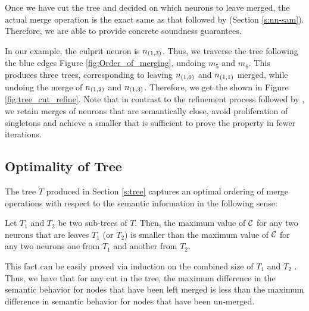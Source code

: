 Once we have cut the tree and decided on which neurons to leave merged, the
actual merge operation is the exact same as that followed by \cite{cegar-nn}
(Section \ref{s:nn-sam}). Therefore, we are able to provide concrete soundness
guarantees.

In our example, the culprit neuron is $n_{(1,3)}$. Thus, we traverse the tree
following the blue edges Figure \ref{fig:Order_of_merging}, undoing $m_5$ and
$m_6$. This produces three trees, corresponding to leaving $n_{(1,0)}$ and
$n_{(1,1)}$ merged, while undoing the merge of $n_{(1,2)}$ and $n_{(1,3)}$.
Therefore, we get the \abs shown in Figure \ref{fig:tree_cut_refine}. Note
that in contrast to the refinement process followed by \cite{cegar-nn} , we retain merges of neurons that are semantically close, avoid
proliferation of singletons and achieve a smaller \abs that is sufficient to
prove the property in fewer iterations.



\subsection{Optimality of Tree}

The tree $T$ produced in Section \ref{s:tree} captures an optimal ordering of
merge operations with respect to the semantic information in the following
sense:

Let $T_1$ and $T_2$ be two sub-trees of $T$. Then, the maximum value of $\mathcal{C}$
for any two neurons that are leaves $T_1$ (or $T_2$) is smaller than the maximum
value of $\mathcal{C}$ for any two neurons one from $T_1$ and another from $T_2$.

This fact can be easily proved via induction on the combined size of $T_1$ and
$T_2$ . Thus, we have that for any cut in the tree, the
maximum difference in the semantic behavior for nodes that have been left merged
is less than the maximum difference in semantic behavior for nodes that have
been un-merged.

